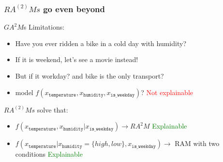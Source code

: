 \documentclass{beamer}
\begin{document}
\begin{frame}
  \frametitle{$RA^{(2)}Ms$ go even beyond}

  $GA^2M$s Limitations:
  \begin{itemize}
  \item<2-> Have you ever ridden a bike in a cold day with humidity?
  \item<3-> If it is weekend, let's see a movie instead!
  \item<4-> But if it workday? and bike is the only transport?
  \item<5-> model $f(x_{\mathtt{temperature}}, x_{\mathtt{humidity}}, x_{\mathtt{is\_weekday}})$?  {\textcolor{red}{Not explainable}}
  \end{itemize}

  \noindent\makebox[\linewidth]{\rule{\paperwidth}{0.4pt}}

  $RA^{(2)}Ms$ solve that:

  \begin{itemize}
  \item<7-> \(f(x_{\mathtt{temperature}}, x_{\mathtt{humidity}} | x_{\mathtt{is\_weekday}}) \rightarrow RA^2M\)  {\textcolor{green}{Explainable}}
    \item<8-> \(f(x_{\mathtt{temperature}}| x_{\mathtt{humidity}} = \{high, low\}, x_{\mathtt{is\_weekday}}) \rightarrow\) RAM with two conditions  {\textcolor{green}{Explainable}}
  \end{itemize}

\end{frame}
\end{document}
